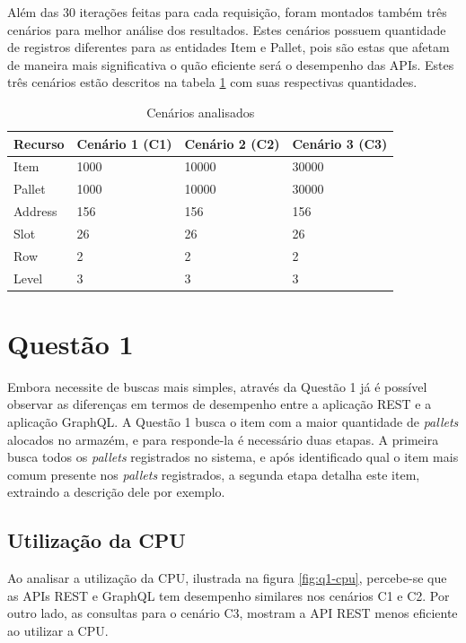 Além das 30 iterações feitas para cada requisição, foram montados também três cenários para melhor análise dos resultados. Estes cenários possuem quantidade de registros diferentes para as entidades \textup{Item} e \textup{Pallet}, pois são estas que afetam de maneira mais significativa o quão eficiente será o desempenho das APIs. Estes três cenários estão descritos na tabela \ref{tab:cenarios} com suas respectivas quantidades.

\begin{table}[htbp]
    \centering
    \begin{tabular}{| l | l | l | l|}
        \hline
        \textbf{Recurso} & \textbf{Cenário 1 (C1)} & \textbf{Cenário 2 (C2)} & \textbf{Cenário 3 (C3)} \\ \hline
        Item & 1000 & 10000 & 30000 \\ \hline
        Pallet & 1000 & 10000 & 30000 \\ \hline
        Address & 156 & 156 & 156 \\ \hline
        Slot & 26 & 26 & 26 \\ \hline
        Row & 2 & 2 & 2 \\ \hline
        Level & 3 & 3 & 3 \\ \hline
    \end{tabular}
    \caption{Cenários analisados} 
    \label{tab:cenarios}
\end{table}

\section{Questão 1}

Embora necessite de buscas mais simples, através da Questão 1 já é possível observar as diferenças em termos de desempenho entre a aplicação REST e a aplicação GraphQL. A Questão 1 busca o item com a maior quantidade de \textit{pallets} alocados no armazém, e para responde-la é necessário duas etapas. A primeira busca todos os \textit{pallets} registrados no sistema, e após identificado qual o item mais comum presente nos \textit{pallets} registrados, a segunda etapa detalha este item, extraindo a descrição dele por exemplo.

\subsection{Utilização da CPU}

Ao analisar a utilização da CPU, ilustrada na figura \ref{fig:q1-cpu}, percebe-se que as APIs REST e GraphQL tem desempenho similares nos cenários C1 e C2. Por outro lado, as consultas para o cenário C3, mostram a API REST menos eficiente ao utilizar a CPU.

